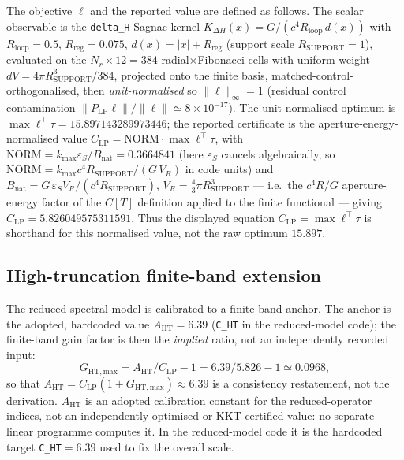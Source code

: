 \documentclass[11pt,a4paper]{article}
\begin{document}
The objective $\ell$ and the reported value are defined as follows. The scalar observable is the \texttt{delta\_H} Sagnac kernel $K_{\Delta H}(x)=G/(c^{4}R_{\mathrm{loop}}\,d(x))$ with $R_{\mathrm{loop}}=0.5$, $R_{\mathrm{reg}}=0.075$, $d(x)=|x|+R_{\mathrm{reg}}$ (support scale $R_{\mathrm{SUPPORT}}=1$), evaluated on the $N_{r}\times12=384$ radial$\times$Fibonacci cells with uniform weight $dV=4\pi R_{\mathrm{SUPPORT}}^{3}/384$, projected onto the finite basis, matched-control-orthogonalised, then \emph{unit-normalised} so $\|\ell\|_{\infty}=1$ (residual control contamination $\|P_{\mathrm{LP}}\ell\|/\|\ell\|\simeq8\times10^{-17}$). The unit-normalised optimum is $\max\ell^{\top}\tau=15.897143289973446$; the reported certificate is the aperture-energy-normalised value $C_{\mathrm{LP}}=\mathrm{NORM}\cdot\max\ell^{\top}\tau$, with $\mathrm{NORM}=k_{\max}\varepsilon_{S}/B_{\mathrm{nat}}=0.3664841$ (here $\varepsilon_{S}$ cancels algebraically, so $\mathrm{NORM}=k_{\max}c^{4}R_{\mathrm{SUPPORT}}/(G\,V_{R})$ in code units) and $B_{\mathrm{nat}}=G\,\varepsilon_{S}V_{R}/(c^{4}R_{\mathrm{SUPPORT}})$, $V_{R}=\tfrac{4}{3}\pi R_{\mathrm{SUPPORT}}^{3}$ --- i.e.\ the $c^{4}R/G$ aperture-energy factor of the $C[T]$ definition applied to the finite functional --- giving $C_{\mathrm{LP}}=5.826049575311591$. Thus the displayed equation $C_{\mathrm{LP}}=\max\ell^{\top}\tau$ is shorthand for this normalised value, not the raw optimum $15.897$.

\subsection{High-truncation finite-band extension}

The reduced spectral model is calibrated to a finite-band anchor. The anchor is the adopted, hardcoded value $A_{\mathrm{HT}}=6.39$ (\texttt{C\_HT} in the reduced-model code); the finite-band gain factor is then the \emph{implied} ratio, not an independently recorded input:
\[
G_{\mathrm{HT,max}} = A_{\mathrm{HT}}/C_{\mathrm{LP}} - 1 = 6.39/5.826 - 1 \simeq 0.0968,
\]
so that $A_{\mathrm{HT}} = C_{\mathrm{LP}}(1+G_{\mathrm{HT,max}})\approx6.39$ is a consistency restatement, not the derivation.
$A_{\mathrm{HT}}$ is an adopted calibration constant for the reduced-operator indices, not an independently optimised or KKT-certified value: no separate linear programme computes it. In the reduced-model code it is the hardcoded target \texttt{C\_HT}$=6.39$ used to fix the overall scale.
\end{document}
